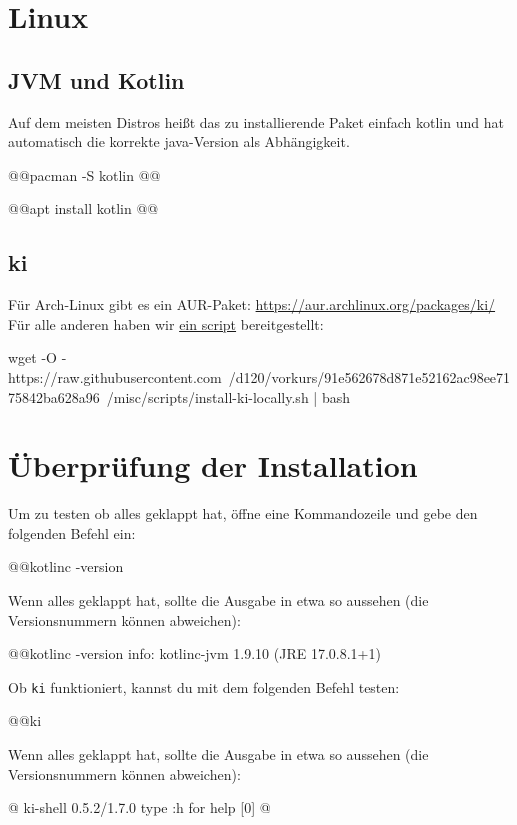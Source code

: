 \section*{Linux}
\subsection*{JVM und Kotlin}
Auf dem meisten Distros heißt das zu installierende Paket einfach {\ttfamily kotlin} und hat automatisch die korrekte java-Version als Abhängigkeit.
\begin{commandshell}[][minted language=text]
    @\shellprefix{}@pacman -S kotlin @@
\end{commandshell}

\begin{commandshell}[][minted language=text]
    @\shellprefix{}@apt install kotlin @@
\end{commandshell}

\subsection*{ki}
Für Arch-Linux gibt es ein AUR-Paket: \url{https://aur.archlinux.org/packages/ki/}
Für alle anderen haben wir \href{https://raw.githubusercontent.com/d120/vorkurs/91e562678d871e52162ac98ee7175842ba628a96/misc/scripts/install-ki-locally.sh}{ein script} bereitgestellt:
\begin{commandshell}
    wget -O - https://raw.githubusercontent.com\
    /d120/vorkurs/91e562678d871e52162ac98ee7175842ba628a96\
    /misc/scripts/install-ki-locally.sh | bash
\end{commandshell}

\section*{Überprüfung der Installation}\label{sec:check}
Um zu testen ob alles geklappt hat, öffne eine Kommandozeile und gebe den folgenden Befehl ein:
\begin{commandshell}
    @\shellprefix{}@kotlinc -version
\end{commandshell}

Wenn alles geklappt hat, sollte die Ausgabe in etwa so aussehen (die Versionsnummern können abweichen):
\begin{commandshell}[][]
    @\shellprefix{}@kotlinc -version
    info: kotlinc-jvm 1.9.10 (JRE 17.0.8.1+1)
\end{commandshell}

Ob \texttt{ki} funktioniert, kannst du mit dem folgenden Befehl testen:
\begin{commandshell}
    @\shellprefix{}@ki
\end{commandshell}
Wenn alles geklappt hat, sollte die Ausgabe in etwa so aussehen (die Versionsnummern können abweichen):
\begin{commandshell}[][minted language=text]
    @\shellprefix@ki
    ki-shell 0.5.2/1.7.0
    type :h for help
    [0] @\shellcursor@
\end{commandshell}


